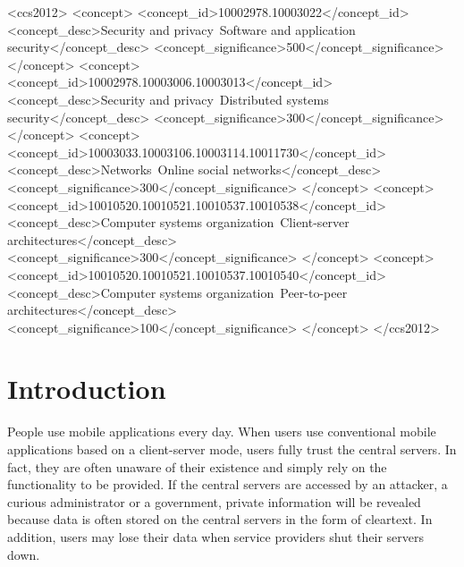 \documentclass{sig-alternate-05-2015}
\begin{document}
%
%
\begin{CCSXML}
	<ccs2012>
	<concept>
	<concept_id>10002978.10003022</concept_id>
	<concept_desc>Security and privacy~Software and application security</concept_desc>
	<concept_significance>500</concept_significance>
	</concept>
	<concept>
	<concept_id>10002978.10003006.10003013</concept_id>
	<concept_desc>Security and privacy~Distributed systems security</concept_desc>
	<concept_significance>300</concept_significance>
	</concept>
	<concept>
	<concept_id>10003033.10003106.10003114.10011730</concept_id>
	<concept_desc>Networks~Online social networks</concept_desc>
	<concept_significance>300</concept_significance>
	</concept>
	<concept>
	<concept_id>10010520.10010521.10010537.10010538</concept_id>
	<concept_desc>Computer systems organization~Client-server architectures</concept_desc>
	<concept_significance>300</concept_significance>
	</concept>
	<concept>
	<concept_id>10010520.10010521.10010537.10010540</concept_id>
	<concept_desc>Computer systems organization~Peer-to-peer architectures</concept_desc>
	<concept_significance>100</concept_significance>
	</concept>
	</ccs2012>
\end{CCSXML}



%
%

%
%
\printccsdesc



\section{Introduction}

People use mobile applications every day. 
When users use conventional mobile applications based on a client-server mode, users fully trust the central servers.
In fact, they are often unaware of their existence and simply rely on the functionality to be provided.
If the central servers are accessed by an attacker, a curious administrator or a government, private information will be revealed because data is often stored on the central servers in the form of cleartext.
In addition, users may lose their data when service providers shut their servers down.
\end{document}
